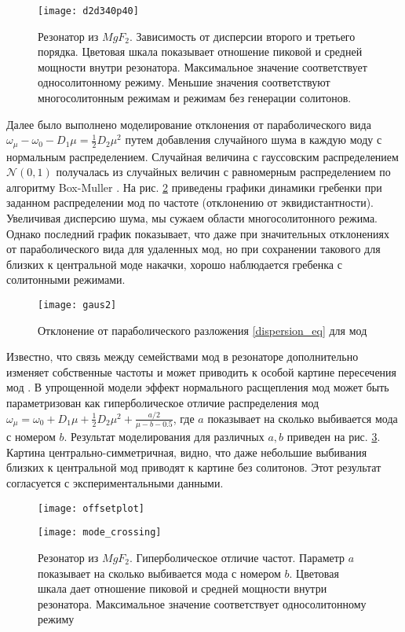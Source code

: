 \begin{figure}
  \centering
  \texttt{[image: d2d340p40]}
  \caption{Резонатор из $MgF_2$. Зависимость от дисперсии второго и третьего порядка. Цветовая шкала показывает отношение пиковой и средней мощности внутри резонатора. Максимальное значение соответствует односолитонному режиму. Меньшие значения соответствуют многосолитонным режимам и режимам без генерации солитонов.} \label{d2d3_plot}
\end{figure}

Далее было выполнено моделирование отклонения от параболического вида $\omega_\mu-\omega_0-D_1\mu=\frac{1}{2}D_2\mu^2$ путем добавления случайного шума в каждую моду с нормальным распределением. Случайная величина с гауссовским распределением $\mathcal{N}(0,1)$ получалась из случайных величин с равномерным распределением по алгоритму Box-Muller \cite{Press2002}. На рис. \ref{gaus} приведены графики динамики гребенки при заданном распределении мод по частоте (отклонению от эквидистантности). Увеличивая дисперсию шума, мы сужаем области многосолитонного режима. Однако последний график показывает, что даже при значительных отклонениях от параболического вида для удаленных мод, но при сохранении такового для близких к центральной моде накачки, хорошо наблюдается гребенка с солитонными режимами.

\begin{figure}
  \centering
  \texttt{[image: gaus2]}
  \caption{Отклонение от параболического разложения \eqref{dispersion_eq} для мод} \label{gaus}
\end{figure}

Известно, что связь между семействами мод в резонаторе дополнительно изменяет собственные частоты и может приводить к особой картине пересечения мод \cite{HerrPRL2014}. В упрощенной модели эффект нормального расщепления мод может быть параметризован как гиперболическое отличие распределения мод $\omega_\mu=\omega_0+D_1\mu+\frac{1}{2}D_2\mu^2+\frac{a/2}{\mu-b-0.5}$, где $a$ показывает на сколько выбивается мода с номером $b$. Результат моделирования для различных $a,b$ приведен на рис. \ref{offsetplot}. Картина центрально-симметричная, видно, что даже небольшие выбивания близких к центральной мод приводят к картине без солитонов. Этот результат согласуется с экспериментальными данными.

\begin{figure}
  \centering
  \texttt{[image: offsetplot]}

  \texttt{[image: mode\_crossing]}
  \caption{Резонатор из $MgF_2$. Гиперболическое отличие частот. Параметр $a$ показывает на сколько выбивается мода с номером $b$. Цветовая шкала дает отношение пиковой и средней мощности внутри резонатора. Максимальное значение соответствует односолитонному режиму} \label{offsetplot}
\end{figure}

